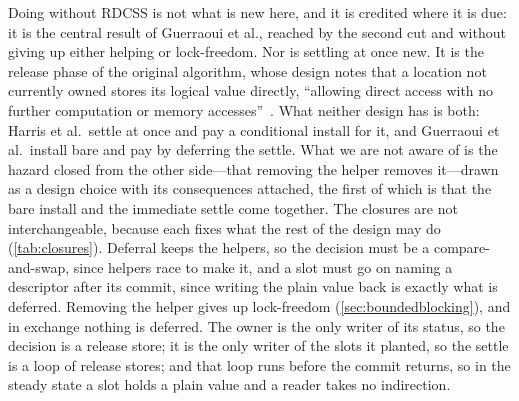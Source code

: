 \documentclass[11pt]{article}
\begin{document}
Doing without RDCSS is not what is new here, and it is credited where it is due:
it is the central result of Guerraoui et al., reached by the second cut and
without giving up either helping or lock-freedom. Nor is settling at once new.
It is the release phase of the original algorithm, whose design notes that a
location not currently owned stores its logical value directly, ``allowing
direct access with no further computation or memory
accesses''~\citep{fraser2004lockfreedom}. What neither design has is both:
Harris et al.\ settle at once and pay a conditional install for it, and
Guerraoui et al.\ install bare and pay by deferring the settle. What we are not
aware of is
the hazard closed from the other side---that removing the helper removes
it---drawn as a design choice with its consequences attached, the first of
which is that the bare install and the immediate settle come together. The
closures
are not interchangeable, because each fixes what the rest of the design may do
(\cref{tab:closures}). Deferral keeps the helpers, so the decision must be a
compare-and-swap, since helpers race to make it, and a slot must go on naming a
descriptor after its commit, since writing the plain value back is exactly what
is deferred. Removing the helper gives up lock-freedom
(\cref{sec:boundedblocking}), and in exchange nothing is deferred. The owner is
the only writer of its status, so the decision is a release store; it is the
only writer of the slots it planted, so the settle is a loop of release stores;
and that loop runs before the commit returns, so in the steady state a slot
holds a plain value and a reader takes no indirection.
\end{document}
